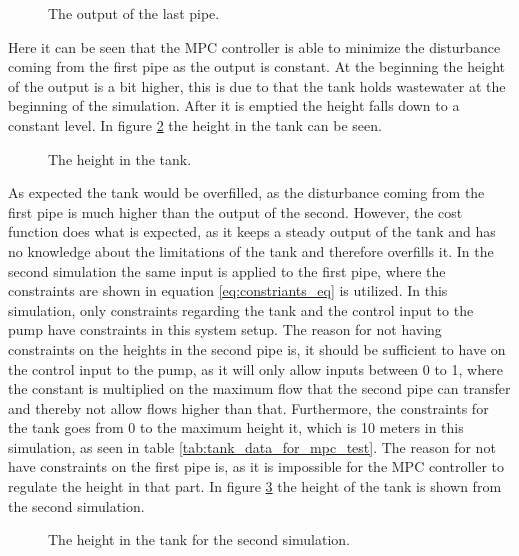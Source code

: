 \begin{figure}[H]
 \centering
 
\caption{The output of the last pipe.}
\label{fig:MPC_test_output_first_test}
\end{figure}

Here it can be seen that the MPC controller is able to minimize the disturbance coming from the first pipe as the output is constant. At the beginning the height of the output is a bit higher, this is due to that the tank holds wastewater at the beginning of the simulation. After it is emptied the height falls down to a constant level. In figure \ref{fig:tank_height_first_test} the height in the tank can be seen.  

\begin{figure}[H]
 \centering
 
\caption{The height in the tank.}
\label{fig:tank_height_first_test}
\end{figure}

As expected the tank would be overfilled, as the disturbance coming from the first pipe is much higher than the output of the second. However, the cost function does what is expected, as it keeps a steady output of the tank and has no knowledge about the limitations of the tank and therefore overfills it. In the second simulation the same input is applied to the first pipe, where the constraints are shown in equation \ref{eq:constriants_eq} is utilized. In this simulation, only constraints regarding the tank and the control input to the pump have constraints in this system setup. The reason for not having constraints on the heights in the second pipe is, it should be sufficient to have on the control input to the pump, as it will only allow inputs between 0 to 1, where the constant is multiplied on the maximum flow that the second pipe can transfer and thereby not allow flows higher than that. Furthermore, the constraints for the tank goes from 0 to the maximum height it, which is 10 meters in this simulation, as seen in table \ref{tab:tank_data_for_mpc_test}. The reason for not have constraints on the first pipe is, as it is impossible for the MPC controller to regulate the height in that part. In figure \ref{fig:tank_height_second_test_with_constraints} the height of the tank is shown from the second simulation.        


\begin{figure}[H]
 \centering
 
\caption{The height in the tank for the second simulation.}
\label{fig:tank_height_second_test_with_constraints}
\end{figure}

